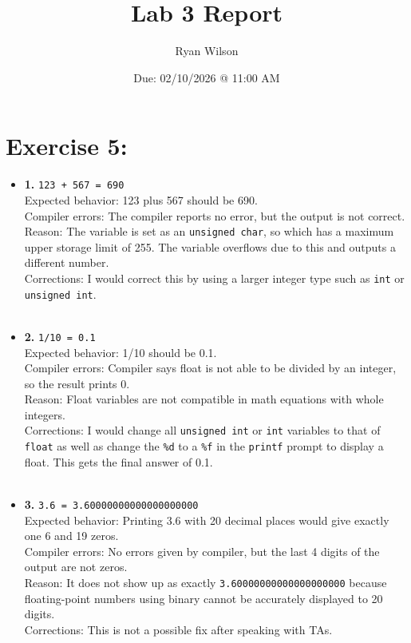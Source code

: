 \documentclass{article}
\title{Lab 3 Report}
\date{Due: 02/10/2026 @ 11:00 AM}
\author{Ryan Wilson}
\begin{document}
\maketitle
\newpage


\section{Exercise 5:}
\begin{itemize}
\item \textbf{1. }\texttt{123 + 567 = 690}\\
  Expected behavior: 123 plus 567 should be 690.\\
  Compiler errors: The compiler reports no error, but the output is not correct.\\
  Reason: The variable is set as an \texttt{unsigned char}, so which has a maximum upper storage limit of 255. The variable overflows due to this and outputs a different number.\\
  Corrections: I would correct this by using a larger integer type such as \texttt{int} or \texttt{unsigned int}.\\
  \\
\item \textbf{2. }\texttt{1/10 = 0.1}\\
  Expected behavior: 1/10 should be 0.1.\\
  Compiler errors: Compiler says float is not able to be divided by an integer, so the result prints 0.\\
  Reason: Float variables are not compatible in math equations with whole integers.\\
  Corrections: I would change all \texttt{unsigned int} or \texttt{int} variables to that of \texttt{float} as well as change the \texttt{\%d} to a \texttt{\%f} in the \texttt{printf} prompt to display a float. This gets the final answer of 0.1.\\
  \\
\item \textbf{3. }\texttt{3.6 = 3.60000000000000000000}\\
  Expected behavior: Printing 3.6 with 20 decimal places would give exactly one 6 and 19 zeros.\\
  Compiler errors: No errors given by compiler, but the last 4 digits of the output are not zeros.\\
  Reason: It does not show up as exactly \texttt{3.60000000000000000000} because floating-point numbers using binary cannot be accurately displayed to 20 digits.\\
  Corrections: This is not a possible fix after speaking with TAs.\\
\end{itemize}
\newpage
\end{document}
